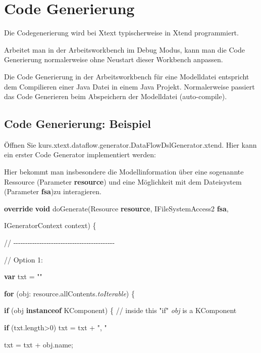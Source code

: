 \documentclass[a4]{article}
\begin{document}
\section[Code
Generierung]{\texorpdfstring{\protect\hypertarget{anchor-33}{}{}\protect\hypertarget{anchor-34}{}{}Code
Generierung}{Code Generierung}}\label{code-generierung}

Die Codegenerierung wird bei Xtext typischerweise in Xtend programmiert.

Arbeitet man in der Arbeitsworkbench im Debug Modus, kann man die Code
Generierung normalerweise ohne Neustart dieser Workbench anpassen.

Die Code Generierung in der Arbeitsworkbench für eine Modelldatei
entspricht dem Compilieren einer Java Datei in einem Java Projekt.
Normalerweise passiert das Code Generieren beim Abspeichern der
Modelldatei (auto-compile).

\subsection[Code Generierung:
Beispiel]{\texorpdfstring{\protect\hypertarget{anchor-35}{}{}Code
Generierung:
Beispiel}{Code Generierung: Beispiel}}\label{code-generierung-beispiel}

Öffnen Sie kurs.xtext.dataflow.generator.DataFlowDslGenerator.xtend.
Hier kann ein erster Code Generator implementiert werden:

Hier bekommt man insbesondere die Modellinformation über eine sogenannte
Ressource (Parameter \textbf{resource}) und eine Möglichkeit mit dem
Dateisystem (Parameter \textbf{fsa})zu interagieren.

\textbf{override} \textbf{void} doGenerate(Resource \textbf{resource},
IFileSystemAccess2 \textbf{fsa},

IGeneratorContext context) \{

//
-\/-\/-\/-\/-\/-\/-\/-\/-\/-\/-\/-\/-\/-\/-\/-\/-\/-\/-\/-\/-\/-\/-\/-\/-\/-\/-\/-\/-\/-\/-\/-\/-\/-\/-\/-\/-\/-\/-\/-\/-\/-\/-

// Option 1:

\textbf{var} txt = ""

\textbf{for} (obj: resource.allContents.\emph{toIterable}) \{

\textbf{if} (obj \textbf{instanceof} KComponent) \{ // inside this "if"
\emph{obj} is a KComponent

\textbf{if} (txt.length\textgreater{}0) txt = txt + ", "

txt = txt + obj.name;
\end{document}
